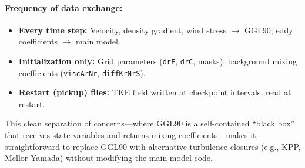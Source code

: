 \documentclass[12pt,letterpaper]{article}
\begin{document}
\paragraph{Frequency of data exchange:}

\begin{itemize}
\item \textbf{Every time step:} Velocity, density gradient, wind stress $\to$ GGL90; eddy coefficients $\to$ main model.
\item \textbf{Initialization only:} Grid parameters (\verb|drF|, \verb|drC|, masks), background mixing coefficients (\verb|viscArNr|, \verb|diffKrNrS|).
\item \textbf{Restart (pickup) files:} TKE field written at checkpoint intervals, read at restart.
\end{itemize}

This clean separation of concerns—where GGL90 is a self-contained ``black box'' that receives state variables and returns mixing coefficients—makes it straightforward to replace GGL90 with alternative turbulence closures (e.g., KPP, Mellor-Yamada) without modifying the main model code.

\end{document}
